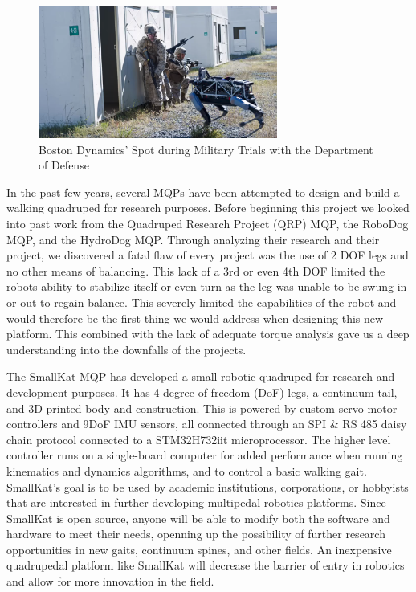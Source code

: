     \begin{figure}[h]
        \centering
        \parbox{0.7\linewidth}{\includegraphics[width=0.7\textwidth]{figures/BostonDynamicsSpotMilitary.png}}
        \caption{Boston Dynamics' Spot during Military Trials with the Department of Defense}
        \label{fig:SpotMilitary} 
    \end{figure}
     
    In the past few years, several MQPs have been attempted to design and build a walking quadruped for research purposes. Before beginning this project we looked into past work from the Quadruped Research Project (QRP) MQP, \cite{QRP_MQP} the RoboDog MQP,\cite{RoboDog_MQP} and the HydroDog MQP. Through analyzing their research and their project, we discovered a fatal flaw of every project was the use of 2 DOF legs and no other means of balancing. This lack of a 3rd or even 4th DOF limited the robots ability to stabilize itself or even turn as the leg was unable to be swung in or out to regain balance. This severely limited the capabilities of the robot and would therefore be the first thing we would address when designing this new platform.  This combined with the lack of adequate torque analysis gave us a deep understanding into the downfalls of the projects. 

    The SmallKat MQP has developed a small robotic quadruped for research and development purposes. It has 4 degree-of-freedom (DoF) legs, a continuum tail, and 3D printed body and construction. This is powered by custom servo motor controllers and 9DoF IMU sensors, all connected through an SPI \& RS 485 daisy chain protocol connected to a STM32H732iit microprocessor. The higher level controller runs on a single-board computer for added performance when running kinematics and dynamics algorithms, and to control a basic walking gait. SmallKat's goal is to be used by academic institutions, corporations, or hobbyists that are interested in further developing multipedal robotics platforms. Since SmallKat is open source, anyone will be able to modify both the software and hardware to meet their needs, openning up the possibility of further research opportunities in new gaits, continuum spines, and other fields. An inexpensive quadrupedal platform like SmallKat will decrease the barrier of entry in robotics and allow for more innovation in the field.

